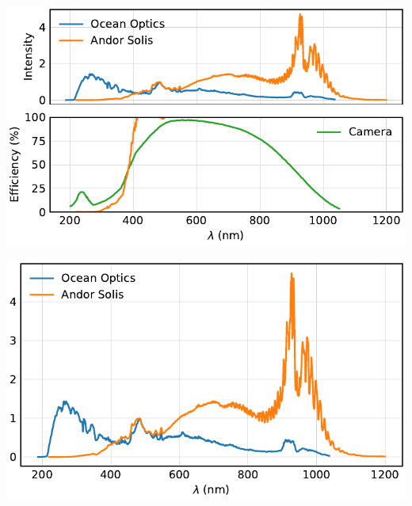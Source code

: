 \begin{frame}
	\centering
	\includegraphics{../analysis/figures/efficiency.pdf}
\end{frame}

\begin{frame}
	\centering
	\includegraphics{../analysis/figures/efficiency_spectrum.pdf}
\end{frame}
